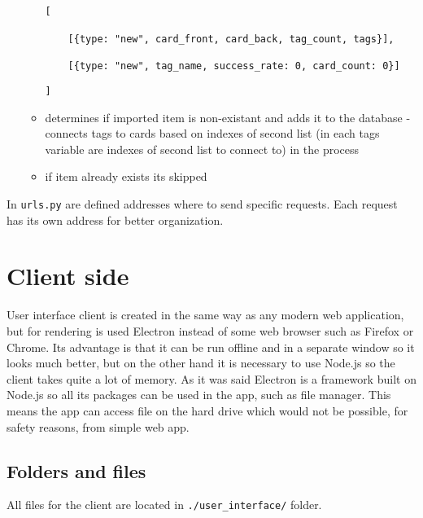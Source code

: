 \documentclass[12pt]{article}
\let\oldtexttt\texttt
\renewcommand{\texttt}[1]{\oldtexttt{\textcolor{codehighlight}{#1}}}
\begin{document}
\begin{itemize}
\begin{itemize}
    \texttt{{[}}

    ~~~~\texttt{{[}\{type:\ "new",\ card\_front,\ card\_back,\ tag\_count,\ tags\}{]},}

    ~~~~\texttt{{[}\{type:\ "new",\ tag\_name,\ success\_rate:\ 0,\ card\_count:\ 0\}{]}}

    \texttt{{]}}
  \item
    determines if imported item is non-existant and adds it to the
    database - connects tags to cards based on indexes of second list
    (in each tags variable are indexes of second list to connect to) in
    the process
  \item
    if item already exists its skipped
  \end{itemize}
\end{itemize}

In \texttt{urls.py} are defined addresses where to send specific
requests. Each request has its own address for better organization.

\hypertarget{client-side}{%
\section{Client side}\label{client-side}}

User interface client is created in the same way as any modern web
application, but for rendering is used Electron instead of some web
browser such as Firefox or Chrome. Its advantage is that it can be run
offline and in a separate window so it looks much better, but on the
other hand it is necessary to use Node.js so the client takes quite a
lot of memory. As it was said Electron is a framework built on Node.js
so all its packages can be used in the app, such as file manager. This
means the app can access file on the hard drive which would not be
possible, for safety reasons, from simple web app.

\hypertarget{folders-and-files}{%
\subsection{Folders and files}\label{folders-and-files}}

All files for the client are located in \texttt{./user\_interface/}
folder.
\end{document}
